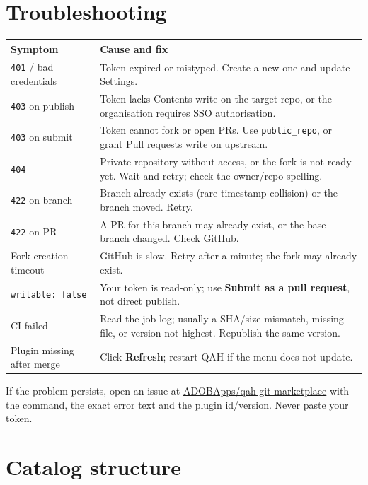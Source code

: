 \documentclass[11pt,a4paper]{article}
\newcommand{\code}[1]{\texttt{#1}}
\newcommand{\repo}{\href{https://github.com/ADOBApps/qah-git-marketplace}{ADOBApps/qah-git-marketplace}}
\begin{document}
\section{Troubleshooting}

\begin{center}
\begin{longtable}{@{}p{6.0cm}p{9.4cm}@{}}
\toprule
Symptom & Cause and fix \\
\midrule
\code{401} / bad credentials & Token expired or mistyped. Create a new one and update Settings. \\
\code{403} on publish & Token lacks Contents write on the target repo, or the organisation requires SSO authorisation. \\
\code{403} on submit & Token cannot fork or open PRs. Use \code{public\_repo}, or grant Pull requests write on upstream. \\
\code{404} & Private repository without access, or the fork is not ready yet. Wait and retry; check the owner/repo spelling. \\
\code{422} on branch & Branch already exists (rare timestamp collision) or the branch moved. Retry. \\
\code{422} on PR & A PR for this branch may already exist, or the base branch changed. Check GitHub. \\
Fork creation timeout & GitHub is slow. Retry after a minute; the fork may already exist. \\
\code{writable: false} & Your token is read-only; use \textbf{Submit as a pull request}, not direct publish. \\
CI failed & Read the job log; usually a SHA/size mismatch, missing file, or version not highest. Republish the same version. \\
Plugin missing after merge & Click \textbf{Refresh}; restart QAH if the menu does not update. \\
\bottomrule
\end{longtable}
\end{center}

If the problem persists, open an issue at \repo{} with the command, the exact
error text and the plugin id/version. Never paste your token.

\appendix
\section{Catalog structure}
\end{document}
